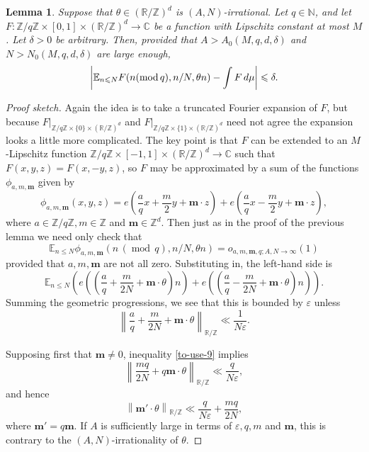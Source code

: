 \documentclass[10pt,reqno]{amsart}
\newtheorem{lemma}[theorem]{Lemma}
\theoremstyle{definition}
\theoremstyle{remark}
\newcommand{\md}[1]{\ensuremath{\,(\operatorname{mod}\, #1)}}
\newcommand{\mdlem}[1]{\ensuremath{(\mbox{\textup{mod}}\, #1)}}
\renewcommand{\leq}{\leqslant}
\def\R{\mathbb{R}}
\def\C{\mathbb{C}}
\def\Z{\mathbb{Z}}
\def\E{\mathbb{E}}
\def\N{\mathbb{N}}
\def\eps{\varepsilon}
\numberwithin{equation}{section}
\begin{document}
\begin{lemma}\label{distribution-integral}
Suppose that $\theta \in (\R/\Z)^d$ is $(A, N)$-irrational. Let $q \in \N$, and let $F : \Z/q\Z \times [0,1] \times (\R/\Z)^d \rightarrow \C$ be a function with Lipschitz constant at most $M$. Let $\delta > 0$ be arbitrary. Then, provided that $A > A_0(M, q, d, \delta)$ and $N>N_0(M,q,d,\delta)$ are large enough,
\[ 
  \left| \E_{n \leq N} F(n \mdlem{q}, n/N, \theta n) - \int F \, d\mu \right| \leq \delta.
\]
\end{lemma}
\begin{proof}[Proof sketch]
Again the idea is to take a truncated Fourier expansion of $F$, but because $F|_{\Z/q\Z\times\{0\}\times(\R/\Z)^d}$ and $F|_{\Z/q\Z\times\{1\}\times(\R/\Z)^d}$ need not agree the expansion looks a little more complicated. The key point is that $F$ can be extended to an $M$-Lipschitz function $\Z/q\Z\times[-1,1]\times(\R/\Z)^d\to\C$ such that $F(x,y,z)=F(x,-y,z)$, so $F$ may be approximated by a sum of the functions $\phi_{a, m, \mathbf{m}}$ given by
\begin{equation}\label{phi}\phi_{a,m ,\mathbf{m}}(x,y,z) = e\left(\frac{a}{q}x+ \frac{m}{2}y + \mathbf{m} \cdot z\right) + e\left(\frac{a}{q}x - \frac{m}{2}y + \mathbf{m} \cdot z\right),\end{equation}
where $a \in \Z/q\Z, m \in \Z$ and $\mathbf{m} \in \Z^d$. Then just as in the proof of the previous lemma we need only check that 
\begin{equation}\label{to-check-22} \E_{n \leq N} \phi_{a, m, \mathbf{m}} (n \md{q}, n/N, \theta n) = o_{a, m, \mathbf{m}, q; A,N \to \infty}(1)\end{equation}
provided that $a,m,\mathbf{m}$ are not all zero. Substituting in, the left-hand side is 
\begin{equation}\label{to-check-3}   \E_{n \leq N} \left(e\left(\left(\frac{a}{q} + \frac{m}{2N} + \mathbf{m} \cdot \theta\right) n  \right) + e\left(\left(\frac{a}{q} - \frac{m}{2N} + \mathbf{m} \cdot \theta\right) n  \right)\right). \end{equation}
Summing the geometric progressions, we see that this is bounded by $\eps$ unless
\begin{equation}\label{to-use-9} \left\| \frac{a}{q} + \frac{m}{2N} + \mathbf{m} \cdot \theta \right\|_{\R/\Z} \ll \frac{1}{N\eps}. \end{equation}

Supposing first that $\mathbf{m} \neq 0$, inequality \eqref{to-use-9} implies
\[   \left\| \frac{mq}{2N} + q \mathbf{m} \cdot \theta \right\|_{\R/\Z} \ll \frac{q}{N\eps}, \]
and hence
\[ \left \| \mathbf{m'} \cdot \theta \right \|_{\R/\Z} \ll \frac{q}{N\eps} + \frac{mq}{2N}, \]
where $\mathbf{m'} = q\mathbf{m}$. If $A$ is sufficiently large in terms of $\eps, q, m$ and $\mathbf{m}$, this is contrary to the $(A,N)$-irrationality of $\theta$.


\end{proof}
\end{document}
